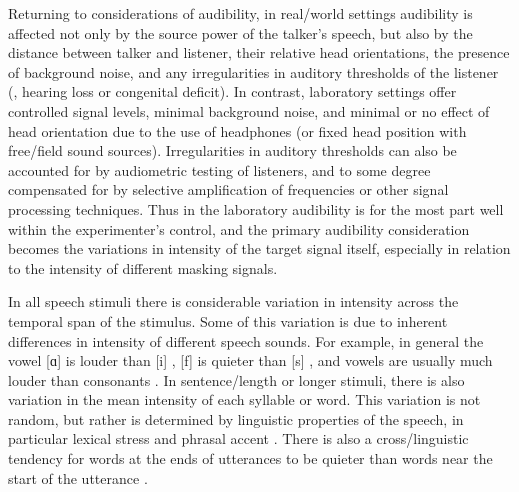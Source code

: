 Returning to considerations of audibility, in real\-/world settings audibility is affected not only by the source power of the talker’s speech, but also by the distance between talker and listener, their relative head orientations, the presence of background noise, and any irregularities in auditory thresholds of the listener (\ie, hearing loss or congenital deficit).  In contrast, laboratory settings offer controlled signal levels, minimal background noise, and minimal or no effect of head orientation due to the use of headphones (or fixed head position with free\-/field sound sources).  Irregularities in auditory thresholds can also be accounted for by audiometric testing of listeners, and to some degree compensated for by selective amplification of frequencies or other signal processing techniques.  Thus in the laboratory audibility is for the most part well within the experimenter’s control, and the primary audibility consideration becomes the variations in intensity of the target signal itself, especially in relation to the intensity of different masking signals.

In all speech stimuli there is considerable variation in intensity across the temporal span of the stimulus.  Some of this variation is due to inherent differences in intensity of different speech sounds.  For example, in general the vowel [ɑ] is louder than [i] \citep{Ladefoged1967}, [f] is quieter than [s] \citep{sowl}, and vowels are usually much louder than consonants \citep{HoriiEtAl1971}.  In sentence\-/length or longer stimuli, there is also variation in the mean intensity of each syllable or word.  This variation is not random, but rather is determined by linguistic properties of the speech, in particular lexical stress and phrasal accent \citep{Fry1955, SluijterVanHeuven1993, SluijterVanHeuven1996, PlagEtAl2011}.  There is also a cross\-/linguistic tendency for words at the ends of utterances to be quieter than words near the start of the utterance \citep{StrikBoves1995, TrouvainEtAl1998}.  

